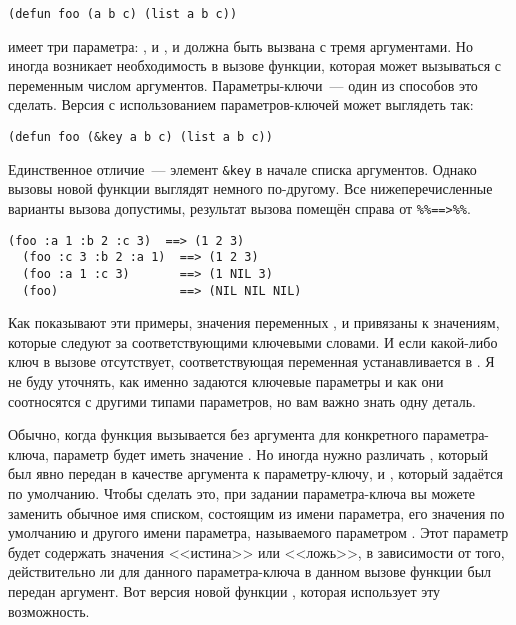 \begin{lstlisting}
(defun foo (a b c) (list a b c))
\end{lstlisting}

имеет три параметра: ,  и , и должна быть вызвана с тремя
аргументами. Но иногда возникает необходимость в вызове функции, которая может вызываться
с переменным числом аргументов. Параметры-ключи~--- один из способов это сделать. Версия
 с использованием параметров-ключей может выглядеть так:

\begin{lstlisting}
(defun foo (&key a b c) (list a b c))
\end{lstlisting}

Единственное отличие~--- элемент \lstinline!&key! в начале списка аргументов. Однако вызовы
новой функции  выглядят немного по-другому. Все нижеперечисленные варианты
вызова  допустимы, результат вызова помещён справа от \lstinline!%%==>%%!.

\begin{lstlisting}[style=lisprepl]
  (foo :a 1 :b 2 :c 3)  ==> (1 2 3)
  (foo :c 3 :b 2 :a 1)  ==> (1 2 3)
  (foo :a 1 :c 3)       ==> (1 NIL 3)
  (foo)                 ==> (NIL NIL NIL)
\end{lstlisting}

Как показывают эти примеры, значения переменных ,  и  привязаны
к значениям, которые следуют за соответствующими ключевыми словами. И если какой-либо
ключ в вызове отсутствует, соответствующая переменная устанавливается в . Я не
буду уточнять, как именно задаются ключевые параметры и как они соотносятся с другими
типами параметров, но вам важно знать одну деталь.

Обычно, когда функция вызывается без аргумента для конкретного параметра-ключа, параметр
будет иметь значение . Но иногда нужно различать , который был явно
передан в качестве аргумента к параметру-ключу, и , который задаётся по
умолчанию. Чтобы сделать это, при задании параметра-ключа вы можете заменить обычное имя
списком, состоящим из имени параметра, его значения по умолчанию и другого имени
параметра, называемого параметром . Этот параметр  будет
содержать значения <<истина>> или <<ложь>>, в зависимости от того, действительно ли для
данного параметра-ключа в данном вызове функции был передан аргумент. Вот версия новой
функции , которая использует эту возможность.

